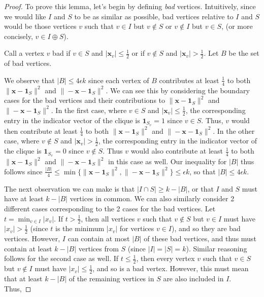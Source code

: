 \documentclass{article}
\begin{document}
\begin{proof}
    To prove this lemma, let's begin by defining \emph{bad} vertices.
    Intuitively, since we would like $I$ and $S$ to be as similar as possible, bad vertices relative to $I$ and $S$ would be those vertices
    $v$ such that $v \in I$ but $v \notin S$ or $v \notin I$ but $v \in S$,
    (or more concisely, $v \in I \oplus S$).
    \begin{definition}
        Call a vertex $v$ bad if $v \in S$ and $|\mathbf{x}_{v}| \leq \frac{1}{2}$ or if $v
        \not\in S$ and $|\mathbf{x}_{v}| > \frac{1}{2}$. Let $B$ be the set of bad vertices.
    \end{definition}
    We observe that $|B| \leq 4 \epsilon k$ since each vertex of $B$
    contributes at least $\frac{1}{4}$ to both $\|\mathbf{x} - \mathbf{1}_{S}\|^{2}$ and
    $\|-\mathbf{x} - \mathbf{1}_{S}\|^{2}$. We can see this by considering the boundary
    cases for the bad vertices and their contributions to $\|\mathbf{x} -
    \mathbf{1}_{S}\|^{2}$ and $\|-\mathbf{x} - \mathbf{1}_{S}\|^{2}$. In the first case,
    where $v \in S$ and $|\mathbf{x}_v| \leq \frac{1}{2}$, the corresponding entry in
    the indicator vector of the clique is $\mathbf{1}_{S}_{v} = 1$ since $v \in
    S$. Thus, $v$ would then contribute at least $\frac{1}{4}$ to both $\|\mathbf{x} -
    \mathbf{1}_{S}\|^{2}$ and $\|-\mathbf{x} - \mathbf{1}_{S}\|^{2}$. In the
    other case, where $v \notin S$ and $|\mathbf{x}_{v}| > \frac{1}{2}$, the
    corresponding entry in the indicator vector of the clique is
    $\mathbf{1}_{S}_{v} = 0$ since $v \notin S$. Thus $v$ would also contribute
    at least $\frac{1}{4}$ to both $\|\mathbf{x} -
    \mathbf{1}_{S}\|^{2}$ and $\|-\mathbf{x} - \mathbf{1}_{S}\|^{2}$ in this
    case as well. Our inequality for $|B|$ thus follows since
    $\frac{|B|}{4} \leq \min\{\|\mathbf{x} - \mathbf{1}_{S}\|^{2}, \|-\mathbf{x} - \mathbf{1}_{S}\|^{2}\} \leq
    \epsilon k$, so that $|B| \leq 4 \epsilon k$.

    The next observation we can make is that $|I \cap S| \geq k - |B|$, or that $I$ and $S$ must have at least $k
    - |B|$ vertices in common. We can also similarly consider 2 different cases
    corresponding to the 2 cases for the bad vertices. Let $t = \min_{v \in I}
    |x_{v}|$. If $t > \frac{1}{2}$, then all vertices $v$ such that $v \notin
    S$ but $v \in I$ must have $|x_{v}| > \frac{1}{2}$ (since $t$ is the
    minimum $|x_{v}|$ for vertices $v \in I$), and so they are bad vertices.
    However, $I$ can contain at most $|B|$ of these bad vertices, and thus must
    contain at least $k - |B|$ vertices from $S$ (since $|I| = |S| = k$).
    Similar reasoning follows for the second case as well. If $t \leq
    \frac{1}{2}$, then every vertex $v$ such that $v \in S$ but $v \notin I$
    must have $|x_{v}| \leq \frac{1}{2}$, and so is a bad vertex. However, this
    must mean that at least $k - |B|$ of the remaining vertices in $S$ are also
    included in $I$. Thus, 

\end{proof}
\end{document}
